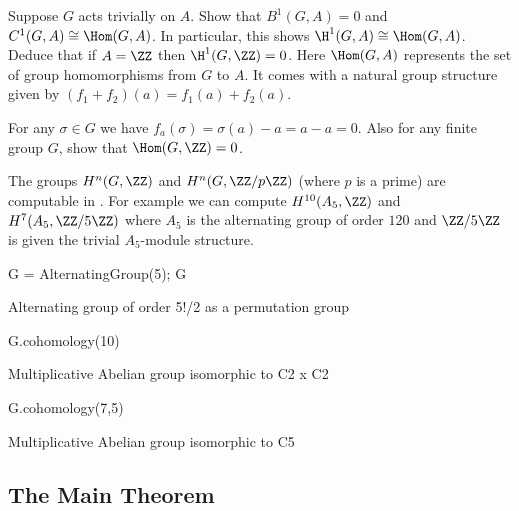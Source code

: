 \begin{exercise}\label{ex:H1hom}
  Suppose $G$ acts trivially on $A$.
  Show that $B^1(G,A)=0$ and $C^1(G,A) \cong \Hom(G,A)$.
  In particular, this shows $\H^1(G,A) \cong \Hom(G,A)$.
  Deduce that if $A = \ZZ$ then $\H^1(G,\ZZ) = 0$.
  Here $\Hom(G,A)$ represents the set of group homomorphisms
  from $G$ to $A$. It comes with a natural group structure
  given by $(f_1+f_2)(a) = f_1(a)+f_2(a)$.
  
  \begin{hint}
    For any $\sigma\in G$ we have
    $f_a(\sigma) = \sigma(a) - a = a - a = 0$.
    Also for any finite group $G$, show that $\Hom(G,\ZZ) = 0$.
  \end{hint}
\end{exercise}

\begin{example}
  The groups $H^n(G,\ZZ)$ and $H^n(G,\ZZ/p\ZZ)$ (where $p$ is a prime)
  are computable in {\Sage}. For example we can compute $H^{10}(A_5,\ZZ)$
  and $H^{7}(A_5,\ZZ/5\ZZ)$ where $A_5$ is the alternating group of
  order $120$ and $\ZZ/5\ZZ$ is given the trivial $A_5$-module structure.
\begin{sagecode}
\begin{sagecell}
G = AlternatingGroup(5); G
\end{sagecell}
\begin{sageout}
Alternating group of order 5!/2 as a permutation group
\end{sageout}
\begin{sagecell}
G.cohomology(10)
\end{sagecell}
\begin{sageout}
Multiplicative Abelian group isomorphic to C2 x C2
\end{sageout}
\begin{sagecell}
G.cohomology(7,5)
\end{sagecell}
\begin{sageout}
Multiplicative Abelian group isomorphic to C5
\end{sageout}
\end{sagecode}
\end{example}

\subsection{The Main Theorem}

